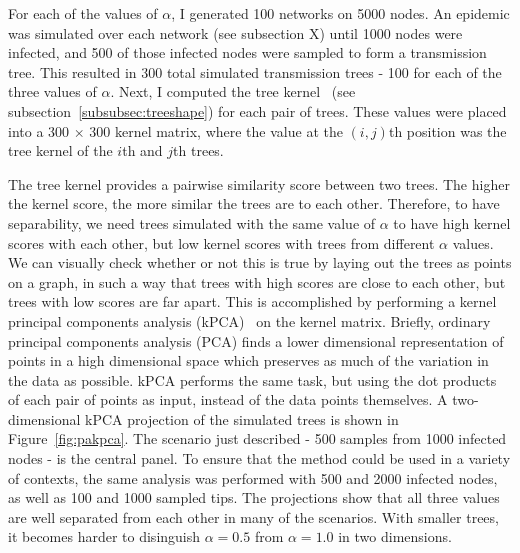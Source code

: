 For each of the values of $\alpha$, I generated 100 networks on 5000 nodes. An
epidemic was simulated over each network (see subsection X) until 1000 nodes
were infected, and 500 of those infected nodes were sampled to form a
transmission tree. This resulted in 300 total simulated transmission trees -
100 for each of the three values of $\alpha$. Next, I computed the tree
kernel~\autocite{poon2013mapping} (see subsection~\ref{subsubsec:treeshape})
for each pair of trees. These values were placed into a 300 $\times$ 300 kernel
matrix, where the value at the $(i, j)$th position was the tree kernel of the 
$i$th and $j$th trees. 

The tree kernel provides a pairwise similarity score between two trees. The
higher the kernel score, the more similar the trees are to each other.
Therefore, to have separability, we need trees simulated with the same value of
$\alpha$ to have high kernel scores with each other, but low kernel scores with
trees from different $\alpha$ values. We can visually check whether or not this
is true by laying out the trees as points on a graph, in such a way that trees
with high scores are close to each other, but trees with low scores are far
apart. This is accomplished by performing a kernel principal components
analysis (kPCA)~\autocite{scholkopf1998nonlinear} on the kernel matrix.
Briefly, ordinary principal components analysis (PCA) finds a lower dimensional
representation of points in a high dimensional space which preserves as much of
the variation in the data as possible. kPCA performs the same task, but using
the dot products of each pair of points as input, instead of the data points
themselves. A two-dimensional kPCA projection of the simulated trees is shown
in Figure~\ref{fig:pakpca}. The scenario just described - 500 samples from 1000
infected nodes - is the central panel. To ensure that the method could be used
in a variety of contexts, the same analysis was performed with 500 and 2000
infected nodes, as well as 100 and 1000 sampled tips. The projections show that
all three values are well separated from each other in many of the scenarios.
With smaller trees, it becomes harder to disinguish $\alpha = 0.5$ from $\alpha
= 1.0$ in two dimensions.

